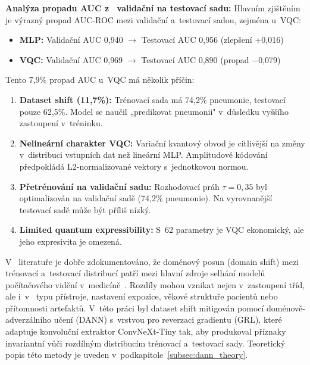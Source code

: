\documentclass[12pt, a4paper]{report}
\begin{document}
\textbf{Analýza propadu AUC z ~validační na testovací sadu:}
Hlavním zjištěním je výrazný propad AUC-ROC mezi validační a~testovací sadou, zejména u~VQC:

\begin{itemize}
    \item \textbf{MLP:} Validační AUC 0{,}940 $\rightarrow$ Testovací AUC 0{,}956 (zlepšení +0{,}016)
    \item \textbf{VQC:} Validační AUC 0{,}969 $\rightarrow$ Testovací AUC 0{,}890 (propad $-$0{,}079)
\end{itemize}

Tento 7{,}9\% propad AUC u~VQC má několik příčin:

\begin{enumerate}
    \item \textbf{Dataset shift (11{,}7\%):} Trénovací sada má 74{,}2\% pneumonie, testovací pouze 62{,}5\%. Model se naučil „predikovat pneumonii" v~důsledku vyššího zastoupení v~tréninku.
    
    \item \textbf{Nelineární charakter VQC:} Variační kvantový obvod je citlivější na změny v~distribuci vstupních dat než lineární MLP. Amplitudové kódování předpokládá L2-normalizované vektory s~jednotkovou normou.
    
    \item \textbf{Přetrénování na validační sadu:} Rozhodovací práh $\tau = 0{,}35$ byl optimalizován na validační sadě (74{,}2\% pneumonie). Na vyrovnanější testovací sadě může být příliš nízký.
    
    \item \textbf{Limited quantum expressibility:} S~62 parametry je VQC ekonomický, ale jeho expresivita je omezená.
\end{enumerate}

V ~literatuře je dobře zdokumentováno, že doménový posun (domain shift) mezi trénovací a~testovací distribucí patří mezi hlavní zdroje selhání modelů počítačového vidění v~medicíně~\cite{domain_shift_chestxray}. Rozdíly mohou vznikat nejen v~zastoupení tříd, ale i~v ~typu přístroje, nastavení expozice, věkové struktuře pacientů nebo přítomnosti artefaktů. V~této práci byl dataset shift mitigován pomocí doménově-adverzálního učení (DANN) s~vrstvou pro reverzaci gradientu (GRL), které adaptuje konvoluční extraktor ConvNeXt-Tiny tak, aby produkoval příznaky invariantní vůči rozdílným distribucím trénovací a~testovací sady. Teoretický popis této metody je uveden v~podkapitole~\ref{subsec:dann_theory}.
\end{document}

